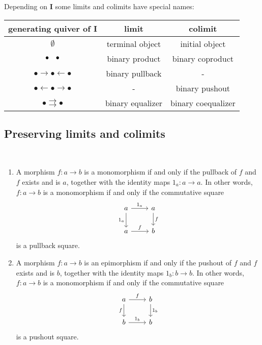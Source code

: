 \begin{example}\label{ex:limits}
Depending on \textbf{I} some limits and colimits have special names:
\begin{center}
\begin{tabular}{c|c|c}
generating quiver of $\mathbf{I}$ & limit & colimit \\
\hline
$\emptyset$ & terminal object & initial object \\
$\bullet \text{\phantom{$\rightarrow$}} \bullet$ & binary product & binary coproduct \\
$\bullet \rightarrow \bullet \leftarrow \bullet$ & binary pullback & - \\
$\bullet \leftarrow \bullet \rightarrow \bullet$  & - & binary pushout \\
$ \bullet \rightrightarrows \bullet$ & binary equalizer & binary coequalizer
\end{tabular}
\end{center}
\end{example}

\subsection{Preserving limits and colimits}

\begin{lemma}\label{prop:mono_pullback}\phantom{}\\
\begin{enumerate}
\renewcommand{\labelenumi}{(\theenumi)}
\item A morphism $f : a \rightarrow b$ is a monomorphism if and only if
the pullback of $f$ and $f$ exists and is $a$, together with the identity maps $1_{a} : a \rightarrow a$.
In other words, $f : a \rightarrow b$ is a monomorphism if and only if the commutative square
\[
\begin{tikzcd}
a \arrow[r, "1_{a}"] \arrow[d, "1_{a}"'] & a \arrow[d, "f"] \\
a \arrow[r, "f"]                         & b               
\end{tikzcd}
\]
is a pullback square.
\item A morphism $f : a \rightarrow b$ is an epimorphism if and only if
the pushout of $f$ and $f$ exists and is $b$, together with the identity maps $1_{b} : b \rightarrow b$.
In other words, $f : a \rightarrow b$ is a monomorphism if and only if the commutative square
\[
\begin{tikzcd}
a \arrow[r, "f"] \arrow[d, "f"'] & b \arrow[d, "1_{b}"] \\
b \arrow[r, "1_{b}"]                         & b               
\end{tikzcd}
\]
is a pushout square.
\end{enumerate}
\end{lemma}

